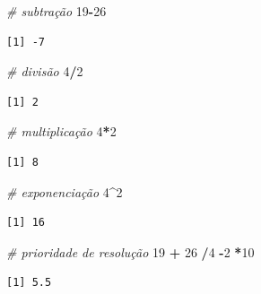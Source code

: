 \documentclass[12pt,portuguese,oneside]{book}
\newenvironment{Shaded}{\begin{snugshade}}{\end{snugshade}}
\newcommand{\DecValTok}[1]{\textcolor[rgb]{0.00,0.00,0.81}{#1}}
\newcommand{\StringTok}[1]{\textcolor[rgb]{0.31,0.60,0.02}{#1}}
\newcommand{\CommentTok}[1]{\textcolor[rgb]{0.56,0.35,0.01}{\textit{#1}}}
\newcommand{\OperatorTok}[1]{\textcolor[rgb]{0.81,0.36,0.00}{\textbf{#1}}}
\begin{document}
\begin{Shaded}
\begin{Highlighting}[]
\CommentTok{# subtração}
\DecValTok{19}\OperatorTok{-}\DecValTok{26}
\end{Highlighting}
\end{Shaded}

\begin{verbatim}
[1] -7
\end{verbatim}

\begin{Shaded}
\begin{Highlighting}[]
\CommentTok{# divisão}
\DecValTok{4}\OperatorTok{/}\DecValTok{2}
\end{Highlighting}
\end{Shaded}

\begin{verbatim}
[1] 2
\end{verbatim}

\begin{Shaded}
\begin{Highlighting}[]
\CommentTok{# multiplicação }
\DecValTok{4}\OperatorTok{*}\DecValTok{2}
\end{Highlighting}
\end{Shaded}

\begin{verbatim}
[1] 8
\end{verbatim}

\begin{Shaded}
\begin{Highlighting}[]
\CommentTok{# exponenciação}
\DecValTok{4}\OperatorTok{^}\DecValTok{2}
\end{Highlighting}
\end{Shaded}

\begin{verbatim}
[1] 16
\end{verbatim}

\begin{Shaded}
\begin{Highlighting}[]
\CommentTok{# prioridade de resolução}
\DecValTok{19} \OperatorTok{+}\StringTok{ }\DecValTok{26} \OperatorTok{/}\DecValTok{4} \OperatorTok{-}\DecValTok{2} \OperatorTok{*}\DecValTok{10}
\end{Highlighting}
\end{Shaded}

\begin{verbatim}
[1] 5.5
\end{verbatim}
\end{document}
